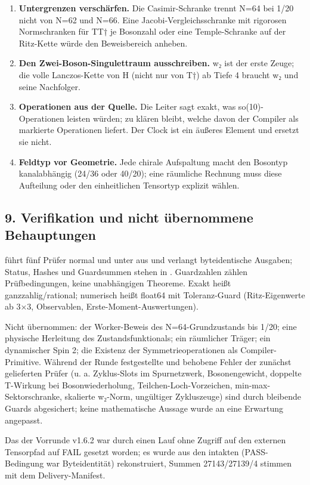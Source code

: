 \begin{enumerate}
\def\labelenumi{\arabic{enumi}.}
\tightlist
\item
  \textbf{Untergrenzen verschärfen.} Die Casimir-Schranke trennt N=64
  bei 1/20 nicht von N=62 und N=66. Eine Jacobi-Vergleichsschranke mit
  rigorosen Normschranken für TT† je Bosonzahl oder eine Temple-Schranke
  auf der Ritz-Kette würde den Beweisbereich anheben.
\item
  \textbf{Den Zwei-Boson-Singulettraum ausschreiben.} w₂ ist der erste
  Zeuge; die volle Lanczos-Kette von H (nicht nur von T†) ab Tiefe 4
  braucht w₂ und seine Nachfolger.
\item
  \textbf{Operationen aus der Quelle.} Die Leiter sagt exakt, was
  so(10)-Operationen leisten würden; zu klären bleibt, welche davon der
  Compiler als markierte Operationen liefert. Der Clock ist ein äußeres
  Element und ersetzt sie nicht.
\item
  \textbf{Feldtyp vor Geometrie.} Jede chirale Aufspaltung macht den
  Bosontyp kanalabhängig (24/36 oder 40/20); eine räumliche Rechnung
  muss diese Aufteilung oder den einheitlichen Tensortyp explizit
  wählen.
\end{enumerate}

\subsection{9. Verifikation und nicht übernommene
Behauptungen}\label{verifikation-und-nicht-uxfcbernommene-behauptungen}

 führt fünf Prüfer normal und unter 
aus und verlangt byteidentische Ausgaben; Status, Hashes und Guardsummen
stehen in . Guardzahlen zählen
Prüfbedingungen, keine unabhängigen Theoreme. Exakt heißt
ganzzahlig/rational; numerisch heißt float64 mit Toleranz-Guard
(Ritz-Eigenwerte ab 3×3, Observablen, Erste-Moment-Auswertungen).

Nicht übernommen: der Worker-Beweis des N=64-Grundzustands bis 1/20;
eine physische Herleitung des Zustandsfunktionals; ein räumlicher
Träger; ein dynamischer Spin 2; die Existenz der Symmetrieoperationen
als Compiler- Primitive. Während der Runde festgestellte und behobene
Fehler der zunächst gelieferten Prüfer (u. a. Zyklus-Slots im
Spurnetzwerk, Bosonengewicht, doppelte T-Wirkung bei Bosonwiederholung,
Teilchen-Loch-Vorzeichen, min-max-Sektorschranke, skalierte w₂-Norm,
ungültiger Zykluszeuge) sind durch bleibende Guards abgesichert; keine
mathematische Aussage wurde an eine Erwartung angepasst.

Das  der Vorrunde v1.6.2 war durch einen
Lauf ohne Zugriff auf den externen Tensorpfad auf FAIL gesetzt worden;
es wurde aus den intakten  (PASS-Bedingung war
Byteidentität) rekonstruiert, Summen 27143/27139/4 stimmen mit dem
Delivery-Manifest.


